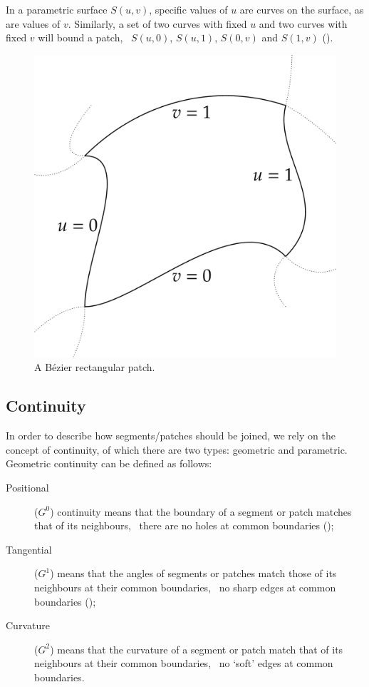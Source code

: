In a parametric surface \(S(u, v)\), specific values of \(u\) are curves on the surface, as are values of \(v\).
Similarly, a set of two curves with fixed \(u\) and two curves with fixed \(v\) will bound a patch, \eg\ \(S(u, 0)\), \(S(u, 1)\), \(S(0, v)\) and \(S(1, v)\) ().

\begin{figure}
\centering
\includegraphics[width=0.5\linewidth]{figs/patch}
\caption{A B\'ezier rectangular patch.}%
\label{fig:patch}
\end{figure}

\subsection{Continuity}

In order to describe how segments/patches should be joined, we rely on the concept of continuity, of which there are two types: geometric and parametric.
Geometric continuity can be defined as follows:

\begin{description}
\item[Positional] (\(G^0\)) continuity means that the boundary of a segment or patch matches that of its neighbours, \ie\ there are no holes at common boundaries ();
\item[Tangential] (\(G^1\)) means that the angles of segments or patches match those of its neighbours at their common boundaries, \ie\ no sharp edges at common boundaries ();
\item[Curvature] (\(G^2\)) means that the curvature of a segment or patch match that of its neighbours at their common boundaries, \ie\ no `soft' edges at common boundaries.
\end{description}

